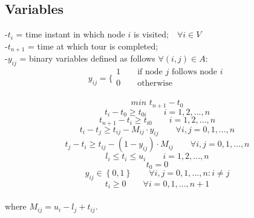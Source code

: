 \documentclass[a4paper,12pt,titlepage]{article}
\begin{document}
\subsection*{Variables}
-$t_i$ = 
time instant in which node $i$ is visited;\,\,\,\ $\forall i\in V$\\
-$t_{n+1}$ =  time at which tour is completed;\\
-$y_{ij}$ = binary variables defined as follows $\forall (i,j)\in A$:
$$y_{ij}=
\bigg \{
\begin{array}{ll}
1\qquad \text{if node $j$ follows node $i$}\\
0\qquad \text{otherwise}\\
\end{array}
$$

\newpage

\begin{equation}
min\,\,t_{n+1}-t_0 
\tag{1}
\end{equation}
\begin{equation}
t_i-t_0 \geq t_{0i} \qquad i=1,2,...,n
\tag{2}
\end{equation}
\begin{equation}
t_{n+1}-t_i \geq t_{i0} \qquad i=1,2,...,n 
\tag{3}
\end{equation}
\begin{equation}
t_i-t_{j}\geq t_{ij}- M_{ij}\cdot y_{ij}  \qquad \forall i,j=0,1,...,n
\tag{4}
\end{equation}
\begin{equation}
t_j-t_{i}\geq t_{ij}- (1-y_{ij})\cdot M_{ij} \qquad \forall i,j=0,1,...,n
\tag{5}
\end{equation}
\begin{equation}
l_i\leq t_i \leq u_i \qquad i=1,2,...,n
\tag{6}
\end{equation}
\begin{equation}
t_0=0
\tag{7}
\end{equation}
\begin{equation}
y_{ij} \in \left\lbrace 0,1\right\rbrace \qquad \forall i,j=0,1,...,n: i\neq j
\tag{8}
\end{equation}
\begin{equation}
t_i \geq 0 \qquad \forall i=0,1,...,n+1
\tag{9}
\end{equation}
\\
where $ M_{ij} = u_i - l_j + t_{ij}$.
\end{document}
